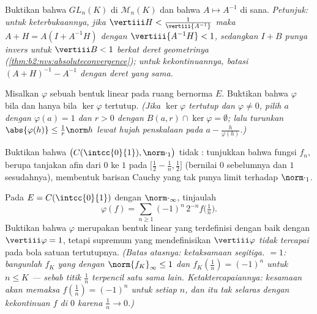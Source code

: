 \begin{exercise}[$\star\star$]\label{exo:b2:nvs:5}
Buktikan bahwa $GL_n(K)$  di $\mathcal{M}_n(K)$ dan bahwa $A
\mapsto A^{-1}$  di sana. \emph{Petunjuk: untuk keterbukaannya,
jika $\vertiii H < \frac{1}{\vertiii{A^{-1}}}$ maka $A + H = A(I +
A^{-1}H)$ dengan $\vertiii{A^{-1}H} < 1$, sedangkan $I + B$ punya invers
untuk $\vertiii B < 1$ berkat deret geometrinya
(\cref{thm:b2:nvs:absoluteconvergence}); untuk kekontinuannya, batasi
$(A+H)^{-1} - A^{-1}$ dengan deret yang sama.}
\end{exercise}

\begin{exercise}[$\star\star$]\label{exo:b2:nvs:6}
Misalkan $\varphi$ sebuah bentuk linear pada ruang bernorma $E$.
Buktikan bahwa $\varphi$  bila dan hanya bila $\ker\varphi$
tertutup. \emph{(Jika $\ker\varphi$ tertutup dan $\varphi \neq 0$, pilih
$a$ dengan $\varphi(a) = 1$ dan $r > 0$ dengan $B(a, r) \cap \ker\varphi
= \emptyset$; lalu turunkan $\abs{\varphi(h)} \leq \frac{1}{r}\norm h$
lewat hujah penskalaan pada $a - \frac{h}{\varphi(h)}$.)}
\end{exercise}

\begin{exercise}[$\star\star$]\label{exo:b2:nvs:7}
Buktikan bahwa $\bigl(C(\intcc{0}{1}), \norm\cdot_1\bigr)$ tidak
: tunjukkan bahwa fungsi $f_n$, berupa tanjakan afin dari $0$ ke
$1$ pada $\bigl[\frac12 - \frac1n, \frac12\bigr]$ (bernilai $0$
sebelumnya dan $1$ sesudahnya), membentuk barisan Cauchy yang tak punya
limit  terhadap $\norm\cdot_1$.
\end{exercise}

\begin{exercise}[$\star\star\star$]\label{exo:b2:nvs:8}
Pada $E = C(\intcc{0}{1})$ dengan $\norm\cdot_\infty$, tinjaulah
\[
\varphi(f) = \sum_{n \geq 1} (-1)^n\, 2^{-n} f\bigl(\tfrac1n\bigr).
\]
Buktikan bahwa $\varphi$ merupakan bentuk linear  yang
terdefinisi dengan baik dengan $\vertiii\varphi = 1$, tetapi supremum
yang mendefinisikan $\vertiii\varphi$ \emph{tidak tercapai} pada bola
satuan tertutupnya. \emph{(Batas atasnya: ketaksamaan segitiga. 
$= 1$: bangunlah $f_K$ yang  dengan $\norm{f_K}_\infty \leq 1$ dan
$f_K(\frac1n) = (-1)^n$ untuk $n \leq K$ --- sebab titik $\frac1n$
terpencil satu sama lain. Ketaktercapaiannya: kesamaan akan memaksa
$f(\frac1n) = (-1)^n$ untuk setiap $n$, dan itu tak selaras dengan
kekontinuan $f$ di $0$ karena $\frac1n \to 0$.)}
\end{exercise}

